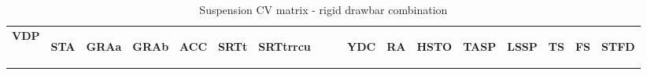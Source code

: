 

\begin{table}[H]
\centering\scriptsize
\caption{Suspension CV matrix - rigid drawbar combination}   
\label{table:suspension-cv-rigid-drawbar}%
\begin{tabular}{|l|c|c|c|c|c|c|c|c|c|c|c|c|c|c|}

\hline
\multicolumn{1}{|c|}{\textbf{VDP}} & \begin{sideways}\textbf{STA}\end{sideways} & \begin{sideways}\textbf{GRAa}\end{sideways} & \begin{sideways}\textbf{GRAb}\end{sideways} & \begin{sideways}\textbf{ACC}\end{sideways} & \begin{sideways}\textbf{SRTt}\end{sideways} & \begin{sideways}\textbf{SRTtrrcu~~~~}\end{sideways} & \begin{sideways}\textbf{YDC}\end{sideways} & \begin{sideways}\textbf{RA}\end{sideways} & \begin{sideways}\textbf{HSTO}\end{sideways} & \begin{sideways}\textbf{TASP}\end{sideways} & \begin{sideways}\textbf{LSSP}\end{sideways} & \begin{sideways}\textbf{TS}\end{sideways} & \begin{sideways}\textbf{FS}\end{sideways} & \begin{sideways}\textbf{STFD}\end{sideways} \bigstrut\\


\end{tabular}
\end{table}
